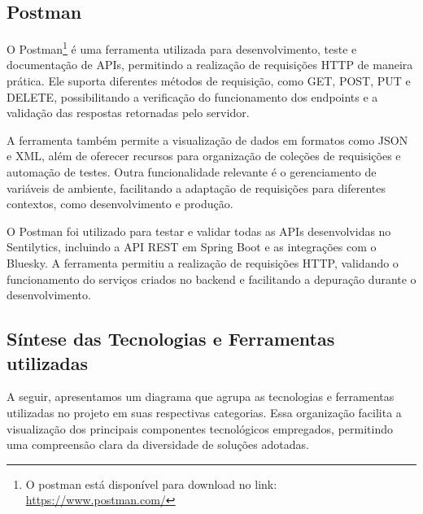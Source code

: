 \documentclass[
	12pt,				%
	oneside,			%
	a4paper,			%
	english,			%
	french,				%
	spanish,			%
	brazil				%
	]{abntex2}
\begin{document}
\hypertarget{postman}{%
\subsection{Postman}\label{postman}}

O Postman\footnote{O postman está disponível para download no link:
  \url{https://www.postman.com/}} é uma ferramenta utilizada para
desenvolvimento, teste e documentação de APIs, permitindo a realização
de requisições HTTP de maneira prática. Ele suporta diferentes métodos
de requisição, como GET, POST, PUT e DELETE, possibilitando a
verificação do funcionamento dos endpoints e a validação das respostas
retornadas pelo servidor.

A ferramenta também permite a visualização de dados em formatos como
JSON e XML, além de oferecer recursos para organização de coleções de
requisições e automação de testes. Outra funcionalidade relevante é o
gerenciamento de variáveis de ambiente, facilitando a adaptação de
requisições para diferentes contextos, como desenvolvimento e produção.

O Postman foi utilizado para testar e validar todas as APIs
desenvolvidas no Sentilytics, incluindo a API REST em Spring Boot e as
integrações com o Bluesky. A ferramenta permitiu a realização de
requisições HTTP, validando o funcionamento do serviços criados no
backend e facilitando a depuração durante o desenvolvimento.

\hypertarget{suxedntese-das-tecnologias-e-ferramentas-utilizadas}{%
\subsection{Síntese das Tecnologias e Ferramentas
utilizadas}\label{suxedntese-das-tecnologias-e-ferramentas-utilizadas}}

A seguir, apresentamos um diagrama que agrupa as tecnologias e
ferramentas utilizadas no projeto em suas respectivas categorias. Essa
organização facilita a visualização dos principais componentes
tecnológicos empregados, permitindo uma compreensão clara da diversidade
de soluções adotadas.
\end{document}

